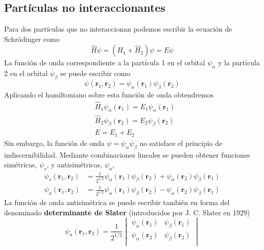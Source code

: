 \subsection{Partículas no interaccionantes}
Para dos partículas que no interaccionan podemos escribir la
ecuación de Schrödinger como
\begin{equation}
    \hat{H}\psi=(\hat{H}_1 + \hat{H}_2)\psi=E\psi
\end{equation}
La función de onda correspondiente a la partícula 1 en el orbital
$\psi_\alpha$ y la partícula 2 en el orbital $\psi_\beta$ se puede
escribir como
\begin{equation}
    \psi(\mathbf{r}_1, \mathbf{r}_2) = \psi_\alpha (\mathbf{r}_1)\psi_\beta (\mathbf{r}_2)
\end{equation}
Aplicando el hamiltoniano sobre esta función de onda
obtendremos
\begin{align}
    &\hat{H}_1\psi_\alpha(\mathbf{r}_1)=E_1\psi_\alpha(\mathbf{r}_1)\\
    &\hat{H}_2\psi_\beta(\mathbf{r}_2)=E_2\psi_\beta(\mathbf{r}_2)\\
    &E = E_1+ E_2
\end{align}
Sin embargo, la función de onda $\psi=\psi_\alpha\psi_\beta$ 
no satisface el principio de indiscernibilidad. Mediante combinaciones
lineales se pueden obtener funciones simétricas, $\psi_s$,
y antisimétricas, $\psi_a$,
\begin{align}
    \psi_s(\mathbf{r}_1, \mathbf{r}_2) &= \frac{1}{2^{1/2}} \psi_\alpha(\mathbf{r}_1) \psi_\beta(\mathbf{r}_2) +  \psi_\alpha(\mathbf{r}_2) \psi_\beta(\mathbf{r}_1)\\
    \psi_a(\mathbf{r}_1, \mathbf{r}_2) &=\frac{1}{2^{1/2}}  \psi_\alpha(\mathbf{r}_1) \psi_\beta(\mathbf{r}_2) -  \psi_\alpha(\mathbf{r}_2) \psi_\beta(\mathbf{r}_1)
\end{align}
La función de onda antisimétrica se puede escribir también en forma
del denominado \textbf{determinante de Slater} (introducidos por
J. C. Slater en 1929)
\begin{equation}
    \psi_a(\mathbf{r}_1,\mathbf{r}_2) = \frac{1}{2^{1/2}}
    \begin{vmatrix} 
    \psi_\alpha(\mathbf{r}_1) & \psi_\beta(\mathbf{r}_1)   \\
    \psi_\alpha(\mathbf{r}_2) & \psi_\beta(\mathbf{r}_2)  \\
    \end{vmatrix}
\end{equation}
